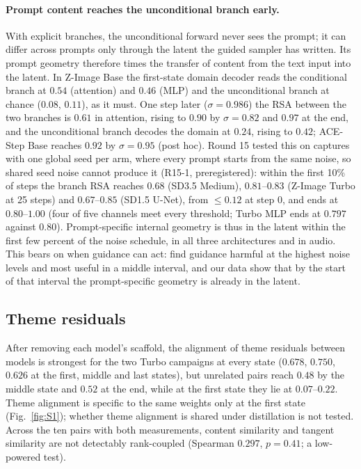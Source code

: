 \documentclass[11pt]{article}
\begin{document}
\paragraph{Prompt content reaches the unconditional branch early.} With explicit branches, the unconditional forward never sees the prompt; it can differ across prompts only through the latent the guided sampler has written. Its prompt geometry therefore times the transfer of content from the text input into the latent. In Z-Image Base the first-state domain decoder reads the conditional branch at $0.54$ (attention) and $0.46$ (MLP) and the unconditional branch at chance ($0.08$, $0.11$), as it must. One step later ($\sigma=0.986$) the RSA between the two branches is $0.61$ in attention, rising to $0.90$ by $\sigma=0.82$ and $0.97$ at the end, and the unconditional branch decodes the domain at $0.24$, rising to $0.42$; ACE-Step Base reaches $0.92$ by $\sigma=0.95$ (post hoc). Round 15 tested this on captures with one global seed per arm, where every prompt starts from the same noise, so shared seed noise cannot produce it (R15-1, preregistered): within the first 10\% of steps the branch RSA reaches $0.68$ (SD3.5 Medium), $0.81$--$0.83$ (Z-Image Turbo at 25 steps) and $0.67$--$0.85$ (SD1.5 U-Net), from $\le0.12$ at step 0, and ends at $0.80$--$1.00$ (four of five channels meet every threshold; Turbo MLP ends at $0.797$ against $0.80$). Prompt-specific internal geometry is thus in the latent within the first few percent of the noise schedule, in all three architectures and in audio. This bears on when guidance can act: \citet{kynkaanniemi2024applying} find guidance harmful at the highest noise levels and most useful in a middle interval, and our data show that by the start of that interval the prompt-specific geometry is already in the latent.

\subsection{Theme residuals}
After removing each model's scaffold, the alignment of theme residuals between models is strongest for the two Turbo campaigns at every state ($0.678$, $0.750$, $0.626$ at the first, middle and last states), but unrelated pairs reach $0.48$ by the middle state and $0.52$ at the end, while at the first state they lie at $0.07$--$0.22$. Theme alignment is specific to the same weights only at the first state (Fig.~\ref{fig:S1}); whether theme alignment is shared under distillation is not tested. Across the ten pairs with both measurements, content similarity and tangent similarity are not detectably rank-coupled (Spearman $0.297$, $p=0.41$; a low-powered test).
\end{document}

